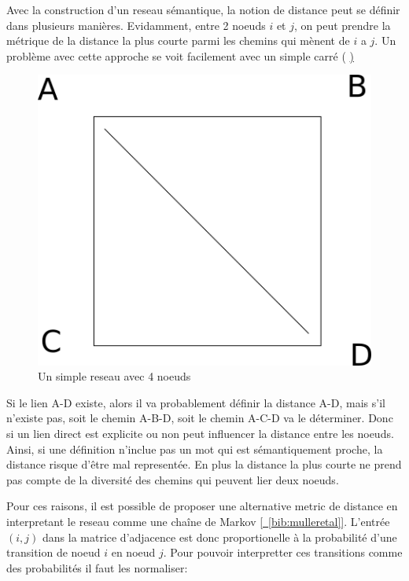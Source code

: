Avec la construction d'un reseau sémantique, la notion de distance peut se définir
dans plusieurs manières. Evidamment, entre 2 noeuds $i$ et $j$, on peut prendre 
la métrique de la distance la plus courte parmi les chemins qui mènent de $i$ a 
$j$. Un problème avec cette approche se voit facilement avec un simple carré ( 
\hyperref[fig:square] )

\begin{figure}[!ht]
\centering
\includegraphics{Images/square.png}
%
\caption{Un simple reseau avec 4 noeuds}
\label{fig:square}
\end{figure}

Si le lien A-D existe, alors il va probablement définir la distance A-D, mais s'il n'existe pas,
soit le chemin A-B-D, soit le chemin A-C-D va le déterminer. Donc si un lien 
direct est explicite ou non peut influencer la distance entre les noeuds. 
Ainsi, si une définition n'inclue pas un mot qui est sémantiquement proche, la 
distance risque d'être mal representée. En plus la distance la plus courte ne 
prend pas compte de la diversité des chemins qui peuvent lier deux noeuds.

Pour ces raisons, il est possible de proposer une alternative metric de distance en interpretant
le reseau comme une chaîne de Markov \hyperref[bib:mulleretal]{[~\ref*{bib:mulleretal}]}.
L'entrée $(i,j)$ dans la  matrice d'adjacence est donc
proportionelle à la probabilité d'une transition de noeud $i$ en noeud $j$. Pour pouvoir interpretter
ces transitions comme des probabilités il faut les normaliser:

